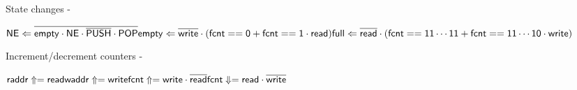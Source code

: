         State changes -

        $
        \mathsf{NE \Leftarrow \overline{empty \cdot NE \cdot \overline{PUSH} \cdot POP}} \\
        \mathsf{empty \Leftarrow \overline{write} \cdot (fcnt==0 + fcnt==1 \cdot read)} \\
        \mathsf{full \Leftarrow \overline{read} \cdot (fcnt==11\cdots11 + fcnt==11\cdots10 \cdot write)}
        $

        Increment/decrement counters -

        $
        \mathsf{raddr\Uparrow = read} \\
        \mathsf{waddr\Uparrow = write} \\
        \mathsf{fcnt\Uparrow = write \cdot \overline{read}} \\
        \mathsf{fcnt\Downarrow = read \cdot \overline{write}}
        $

